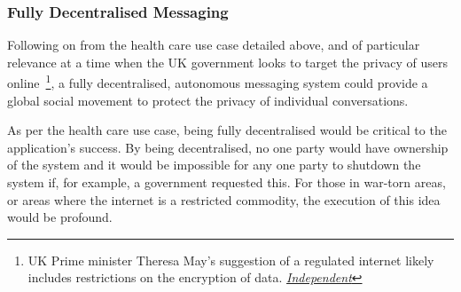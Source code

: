 \subsubsection{Fully Decentralised Messaging}

Following on from the health care use case detailed above, and of particular relevance at a time when the UK government looks to target the privacy of users online~\footnote{UK Prime minister Theresa May's suggestion of a regulated internet likely includes restrictions on the encryption of data. \href{http://www.independent.co.uk/life-style/gadgets-and-tech/news/theresa-may-internet-conservatives-government-a7744176.html}{\textit{Independent}}}, a fully decentralised, autonomous messaging system could provide a global social movement to protect the privacy of individual conversations.

As per the health care use case, being fully decentralised would be critical to the application's success. By being decentralised, no one party would have ownership of the system and it would be impossible for any one party to shutdown the system if, for example, a government requested this. For those in war-torn areas, or areas where the internet is a restricted commodity, the execution of this idea would be profound.
